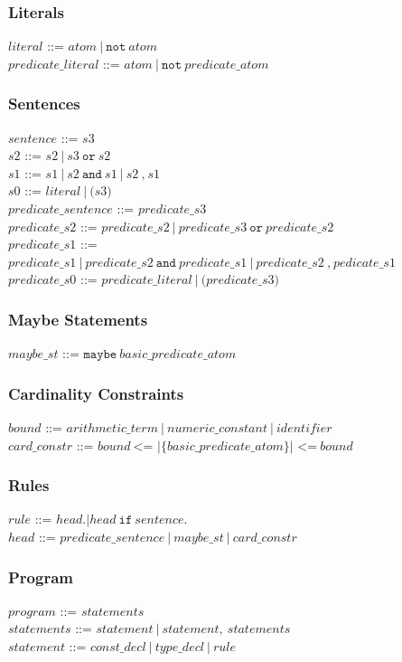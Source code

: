 \documentclass[a4paper,10pt]{article}
\begin{document}
\subsubsection{Literals}
$literal$ ::= $atom~|~\texttt{not}~atom$\\
$predicate\_literal$ ::= $atom~|~\texttt{not}~predicate\_atom$

\subsubsection{Sentences}
$sentence$ ::= $s3$ \\
$s2$ ::= $s2~|~s3~\texttt{or}~s2$\\
$s1$ ::= $s1~|~s2~\texttt{and}~s1~|~s2~\texttt{,}~s1$
\\
$s0$ ::= $literal~|~\texttt{(}s3\texttt{)}$ \\
$predicate\_sentence$ ::= $predicate\_s3$ \\
$predicate\_s2$ ::= $predicate\_s2~|~predicate\_s3~\texttt{or}~predicate\_s2$\\
$predicate\_s1$ ::= $predicate\_s1~|~predicate\_s2~\texttt{and}~predicate\_s1~|~predicate\_s2~\texttt{,}~pedicate\_s1$
\\
$predicate\_s0$ ::= $predicate\_literal~|~\texttt{(}predicate\_s3\texttt{)}$ 


\subsubsection{Maybe Statements}
$maybe\_st$ ::= $\texttt{maybe}~basic\_predicate\_atom$\\
\subsubsection{Cardinality Constraints}
$bound$ ::= $arithmetic\_term~|~numeric\_constant~|~identifier$\\
$card\_constr$ ::= $bound~ \texttt{<= |\{}  basic\_predicate\_atom \texttt{\}| <=} ~bound$\\

\subsubsection{Rules}
$rule$ ::= $head \texttt{.} | head~\texttt{if}~sentence \texttt{.} $ \\
$head$ ::= $predicate\_sentence~|~maybe\_st~|~card\_constr$
 
\subsubsection{Program}
$program$ ::= $statements$\\
$statements$ ::= $statement~|~statement,~statements$\\
$statement$ ::= $ const\_decl~|~type\_decl~|~rule$ 
\end{document}
